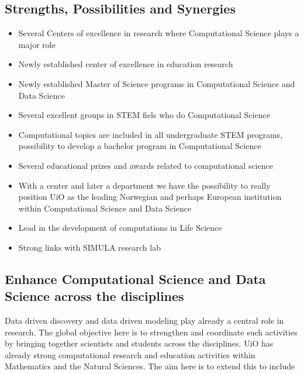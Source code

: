 \documentclass[%
oneside,                 %
final,                   %
10pt]{article}
\begin{document}
\noindent
\subsection{Strengths, Possibilities and Synergies}

\begin{itemize}
\item Several Centers of excellence in research where Computational Science plays a major role

\item Newly established center of excellence in education research

\item Newly established Master of Science programs in Computational Science and Data Science

\item Several excellent groups in STEM fiels who do Computational Science

\item Computational topics are included in all undergraduate STEM programs, possibility to develop a bachelor program in Computational Science

\item Several educational prizes and awards related to computational science 

\item With a center and later a department we have the possibility to really position UiO as the leading Norwegian and perhaps European institution within Computational Science and Data Science

\item Lead in the development of computations in Life Science

\item Strong links with SIMULA research lab
\end{itemize}

\noindent
\subsection{Enhance Computational Science and Data Science across the disciplines}

Data driven discovery and data driven modeling play already a central role in research. The global objective here is to strengthen and coordinate such activities by bringing together scientists and students across the disciplines.
UiO has already strong computational research and education activities within Mathematics and the Natural Sciences.
The aim here is to extend this to include
\end{document}
